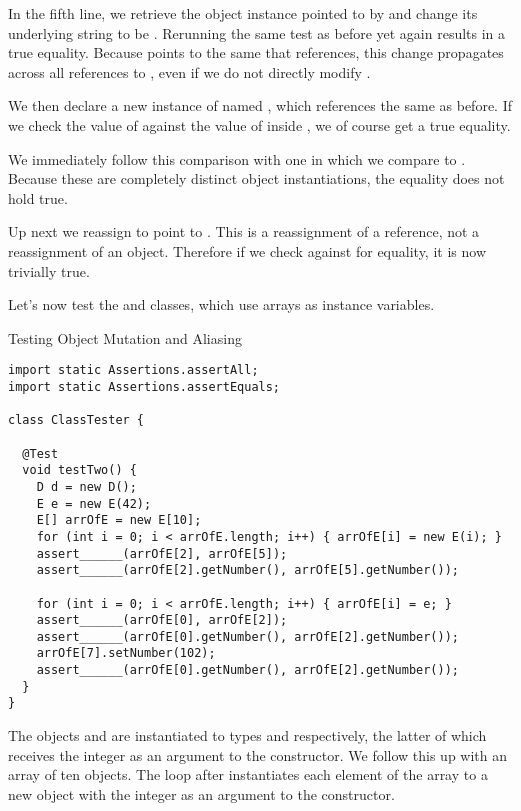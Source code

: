 In the fifth line, we retrieve the  object instance pointed to by  and change its underlying string to be . Rerunning the same test as before yet again results in a true equality. Because  points to the same  that  references, this change propagates across all references to , even if we do not directly modify .

We then declare a new instance of  named , which references the same  as before. If we check the value of  against the value of  inside , we of course get a true equality.

We immediately follow this comparison with one in which we compare  to . Because these are completely distinct object instantiations, the equality does not hold true.

Up next we reassign  to point to . This is a reassignment of a reference, not a reassignment of an object. Therefore if we check  against  for equality, it is now trivially true.

Let's now test the  and  classes, which use arrays as instance variables.

\begin{cl}[]{Testing Object Mutation and Aliasing}
\begin{lstlisting}[language=MyJava]
import static Assertions.assertAll;
import static Assertions.assertEquals;

class ClassTester {

  @Test
  void testTwo() {
    D d = new D();
    E e = new E(42);
    E[] arrOfE = new E[10];
    for (int i = 0; i < arrOfE.length; i++) { arrOfE[i] = new E(i); }
    assert______(arrOfE[2], arrOfE[5]);
    assert______(arrOfE[2].getNumber(), arrOfE[5].getNumber());

    for (int i = 0; i < arrOfE.length; i++) { arrOfE[i] = e; }
    assert______(arrOfE[0], arrOfE[2]);
    assert______(arrOfE[0].getNumber(), arrOfE[2].getNumber());
    arrOfE[7].setNumber(102);
    assert______(arrOfE[0].getNumber(), arrOfE[2].getNumber());
  }
}
\end{lstlisting}
\end{cl}

The objects  and  are instantiated to types  and  respectively, the latter of which receives the integer  as an argument to the constructor. We follow this up with an array of ten  objects. The loop after instantiates each element of the array to a new  object with the integer  as an argument to the constructor.


